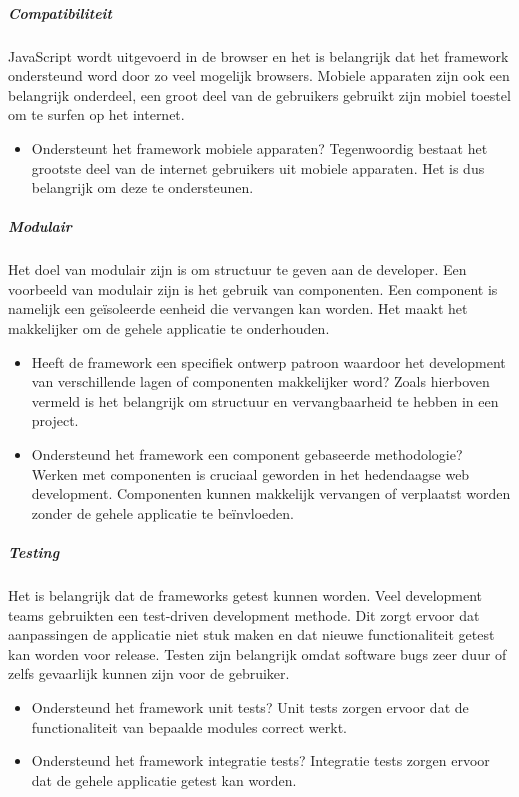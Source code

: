 \subparagraph{Compatibiliteit}
JavaScript wordt uitgevoerd in de browser en het is belangrijk dat het framework ondersteund word door zo veel mogelijk browsers. Mobiele apparaten zijn ook een belangrijk onderdeel, een groot deel van de gebruikers gebruikt zijn mobiel toestel om te surfen op het internet.

\begin{itemize}
	\item Ondersteunt het framework mobiele apparaten? Tegenwoordig bestaat het grootste deel van de internet gebruikers uit mobiele apparaten. Het is dus belangrijk om deze te ondersteunen.
\end{itemize}

\subparagraph{Modulair}
Het doel van modulair zijn is om structuur te geven aan de developer. Een voorbeeld van modulair zijn is het gebruik van componenten. Een component is namelijk een geïsoleerde eenheid die vervangen kan worden. Het maakt het makkelijker om de gehele applicatie te onderhouden.

\begin{itemize}
	\item Heeft de framework een specifiek ontwerp patroon waardoor het development van verschillende lagen of componenten makkelijker word? Zoals hierboven vermeld is het belangrijk om structuur en vervangbaarheid te hebben in een project. 
	\item Ondersteund het framework een component gebaseerde methodologie? Werken met componenten is cruciaal geworden in het hedendaagse web development. Componenten kunnen makkelijk vervangen of verplaatst worden zonder de gehele applicatie te beïnvloeden.
\end{itemize}

\subparagraph{Testing}
Het is belangrijk dat de frameworks getest kunnen worden. Veel development teams gebruikten een test-driven development methode. Dit zorgt ervoor dat aanpassingen de applicatie niet stuk maken en dat nieuwe functionaliteit getest kan worden voor release. Testen zijn belangrijk omdat software bugs zeer duur of zelfs gevaarlijk kunnen zijn voor de gebruiker.

\begin{itemize}
	\item Ondersteund het framework unit tests? Unit tests zorgen ervoor dat de functionaliteit van bepaalde modules correct werkt.
	\item Ondersteund het framework integratie tests? Integratie tests zorgen ervoor dat de gehele applicatie getest kan worden.
\end{itemize}

